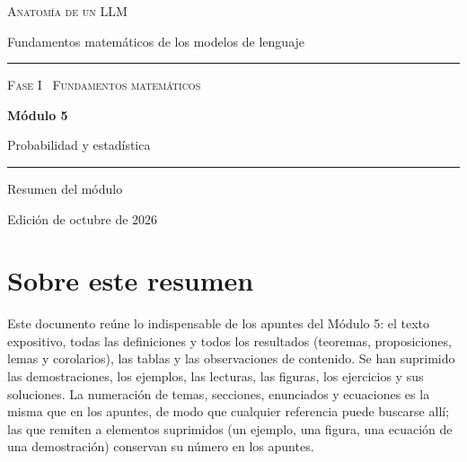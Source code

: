 \documentclass[11pt,a4paper,twoside,openany]{book}
\begin{document}
\frontmatter
\begin{titlepage}
\centering
\vspace*{2.5cm}
{\large\scshape Anatomía de un LLM}\par
\vspace{0.4cm}
{\normalsize Fundamentos matemáticos de los modelos de lenguaje}\par
\vspace{2.2cm}
\rule{\textwidth}{0.8pt}\par\vspace{0.5cm}
{\small\scshape Fase I \textperiodcentered\ Fundamentos matemáticos}\par\vspace{0.3cm}
{\Huge\bfseries Módulo 5\par}\vspace{0.3cm}
{\LARGE Probabilidad y estadística\par}
\vspace{0.5cm}\rule{\textwidth}{0.4pt}\par
\vspace{1.6cm}
{\large Resumen del módulo}\par
\vfill
{\small Edición de octubre de 2026}\par
\end{titlepage}

\chapter*{Sobre este resumen}

Este documento reúne lo indispensable de los apuntes del Módulo 5: el texto expositivo, todas las definiciones y todos los resultados (teoremas, proposiciones, lemas y corolarios), las tablas y las observaciones de contenido. Se han suprimido las demostraciones, los ejemplos, las lecturas, las figuras, los ejercicios y sus soluciones. La numeración de temas, secciones, enunciados y ecuaciones es la misma que en los apuntes, de modo que cualquier referencia puede buscarse allí; las que remiten a elementos suprimidos (un ejemplo, una figura, una ecuación de una demostración) conservan su número en los apuntes.
\end{document}
